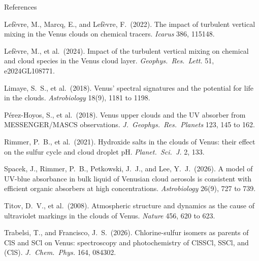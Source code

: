 \documentclass[aspectratio=169,10pt,t,usepdftitle=false]{beamer}
\begin{document}
\begin{frame}{References}
  \scriptsize
  \setlength{\parskip}{1.2mm}
  \raggedright
  Lef\`evre, M., Marcq, E., and Lef\`evre, F.\ (2022). The impact of turbulent vertical mixing in the Venus clouds on chemical tracers. \emph{Icarus} 386, 115148.\par
  Lef\`evre, M., et al.\ (2024). Impact of the turbulent vertical mixing on chemical and cloud species in the Venus cloud layer. \emph{Geophys.\ Res.\ Lett.} 51, e2024GL108771.\par
  Limaye, S.\ S., et al.\ (2018). Venus' spectral signatures and the potential for life in the clouds. \emph{Astrobiology} 18(9), 1181 to 1198.\par
  P\'erez-Hoyos, S., et al.\ (2018). Venus upper clouds and the UV absorber from MESSENGER/MASCS observations. \emph{J.\ Geophys.\ Res.\ Planets} 123, 145 to 162.\par
  Rimmer, P.\ B., et al.\ (2021). Hydroxide salts in the clouds of Venus: their effect on the sulfur cycle and cloud droplet pH. \emph{Planet.\ Sci.\ J.} 2, 133.\par
  Spacek, J., Rimmer, P.\ B., Petkowski, J.\ J., and Lee, Y.\ J.\ (2026). A model of UV-blue absorbance in bulk liquid of Venusian cloud aerosols is consistent with efficient organic absorbers at high concentrations. \emph{Astrobiology} 26(9), 727 to 739.\par
  Titov, D.\ V., et al.\ (2008). Atmospheric structure and dynamics as the cause of ultraviolet markings in the clouds of Venus. \emph{Nature} 456, 620 to 623.\par
  Trabelsi, T., and Francisco, J.\ S.\ (2026). Chlorine-sulfur isomers as parents of ClS and SCl on Venus: spectroscopy and photochemistry of ClSSCl, SSCl, and (ClS). \emph{J.\ Chem.\ Phys.} 164, 084302.\par
\end{frame}
\end{document}
